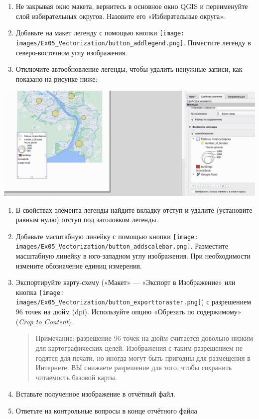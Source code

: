 \documentclass[
  12pt,
]{book}
\begin{document}
\begin{enumerate}
\def\labelenumi{\arabic{enumi}.}
\setcounter{enumi}{6}
\item
  Не закрывая окно макета, вернитесь в основное окно QGIS и переименуйте слой избирательных округов. Назовите его «Избирательные округа».
\item
  Добавьте на макет легенду с помощью кнопки \texttt{[image: images/Ex05\_Vectorization/button\_addlegend.png]}. Поместите легенду в северо-восточном углу изображения.
\item
  Отключите автообновление легенды, чтобы удалить ненужные записи, как показано на рисунке ниже:
\end{enumerate}

\includegraphics{images/Ex05_Vectorization/legend_deleteelements.gif}

\begin{enumerate}
\def\labelenumi{\arabic{enumi}.}
\setcounter{enumi}{9}
\item
  В свойствах элемента легенды найдите вкладку отступ и удалите (установите равным нулю) отступ под заголовком легенды.
\item
  Добавьте масштабную линейку с помощью кнопки \texttt{[image: images/Ex05\_Vectorization/button\_addscalebar.png]}. Разместите масштабную линейку в юго-западном углу изображения. При необходимости измените обозначение единиц измерения.
\item
  Экспортируйте карту-схему («Макет» --- «Экспорт в Изображение» или кнопка \texttt{[image: images/Ex05\_Vectorization/button\_exporttoraster.png]}) с разрешением 96 точек на дюйм (dpi). Используйте опцию «Обрезать по содержимому» (\emph{Crop to Content}).

  \begin{quote}
  Примечание: разрешение 96 точек на дюйм считается довольно низким для картографических целей. Изображения с таким разрешением не годятся для печати, но иногда могут быть пригодны для размещения в Интернете. ВЫ снижаете разрешение для того, чтобы сохранить читаемость базовой карты.
  \end{quote}
\item
  Вставьте полученное изображение в отчётный файл.
\item
  Ответьте на контрольные вопросы в конце отчётного файла
\end{enumerate}
\end{document}
